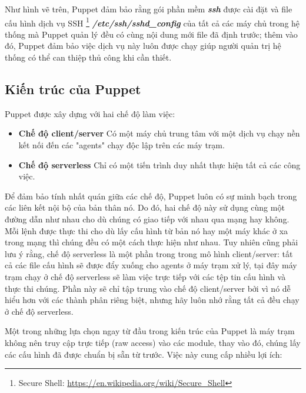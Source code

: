 Như hình vẽ trên, Puppet đảm bảo rằng gói phần mềm \textbf{\textit{ssh}} được cài đặt và file cấu hình dịch vụ SSH \footnote{Secure Shell: \url{https://en.wikipedia.org/wiki/Secure_Shell}} \textbf{\textit{/etc/ssh/sshd\_config}} của tất cả các máy chủ trong hệ thống mà Puppet quản lý đều có cùng nội dung mới file đã định trước; thêm vào đó, Puppet đảm bảo việc dịch vụ này luôn được chạy giúp người quản trị hệ thống có thể can thiệp thủ công khi cần thiết.

\subsection{Kiến trúc của Puppet}

Puppet được xây dựng với hai chế độ làm việc:

\begin{itemize}
\item \textbf{Chế độ client/server} Có một máy chủ trung tâm với một dịch vụ chạy nền kết nối đến các "agents" chạy độc lập trên các máy trạm.

\item \textbf{Chế độ serverless} Chỉ có một tiến trình duy nhất thực hiện tất cả các công việc.
\end{itemize}

Để đảm bảo tính nhất quán giữa các chế độ, Puppet luôn có sự minh bạch trong các liên kết nội bộ của bản thân nó. Do đó, hai chế độ này sử dụng cùng một đường dẫn như nhau cho dù chúng có giao tiếp với nhau qua mạng hay không. Mỗi lệnh được thực thi cho dù lấy cấu hình từ bản nó hay một máy khác ở xa trong mạng thì chúng đều có một cách thực hiện như nhau. Tuy nhiên cũng phải lưu ý rằng, chế độ serverless là một phần trong trong mô hình client/server: tất cả các file cấu hình sẽ được đẩy xuống cho agents ở máy trạm xử lý, tại đây máy trạm chạy ở chế độ serverless sẽ làm việc trực tiếp với các tệp tin cấu hình và thực thi chúng. Phần này sẽ chỉ tập trung vào chế độ client/server bởi vì nó dễ hiểu hơn với các thành phân riêng biệt, nhưng hãy luôn nhớ rằng tất cả đều chạy ở chế độ serverless.

Một trong những lựa chọn ngay từ đầu trong kiến trúc của Puppet là máy trạm không nên truy cập trực tiếp (raw access) vào các module, thay vào đó, chúng lấy các cấu hình đã được chuẩn bị sẵn từ trước. Việc này cung cấp nhiều lợi ích:

